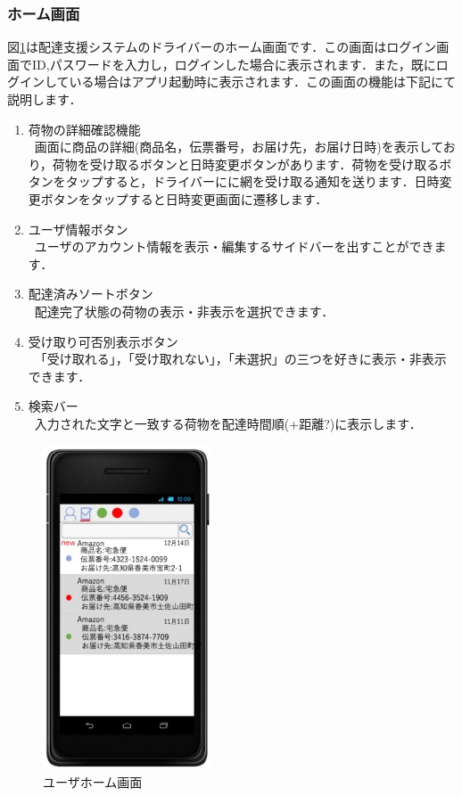 \documentclass[a4j,titlepage]{jarticle}
\begin{document}
\subsubsection{ホーム画面}
図\ref{fig:user_home}は配達支援システムのドライバーのホーム画面です．この画面はログイン画面でID,パスワードを入力し，ログインした場合に表示されます．また，既にログインしている場合はアプリ起動時に表示されます．この画面の機能は下記にて説明します．
\begin{enumerate}
	\item 荷物の詳細確認機能\\
	 \ 画面に商品の詳細(商品名，伝票番号，お届け先，お届け日時)を表示しており，荷物を受け取るボタンと日時変更ボタンがあります．荷物を受け取るボタンをタップすると，ドライバーにに網を受け取る通知を送ります．日時変更ボタンをタップすると日時変更画面に遷移します．
	\item ユーザ情報ボタン\\
	 \ ユーザのアカウント情報を表示・編集するサイドバーを出すことができます．

	\item 配達済みソートボタン\\
   \ 配達完了状態の荷物の表示・非表示を選択できます．

	\item 受け取り可否別表示ボタン\\
	 \ 「受け取れる」，「受け取れない」，「未選択」の三つを好きに表示・非表示できます．

	\item 検索バー\\
	 \ 入力された文字と一致する荷物を配達時間順(+距離?)に表示します．

\end{enumerate}

\begin{figure}[htbp]
 \begin{center}
  \includegraphics[width=50mm]{user_home.pdf}
	\caption{ユーザホーム画面}
	\label{fig:user_home}
 \end{center}

\end{figure}
\end{document}
